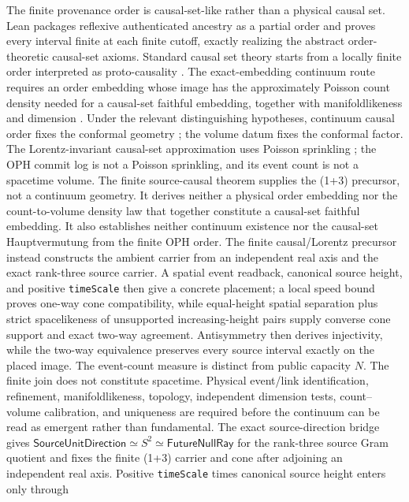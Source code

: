 The finite provenance order is causal-set-like rather than a physical causal
set. Lean packages reflexive authenticated ancestry as a partial order and
proves every interval finite at each finite cutoff, exactly realizing the
abstract order-theoretic causal-set axioms. Standard causal set theory starts from a locally finite order interpreted
as proto-causality \cite{bombelli1987,surya2019}. The exact-embedding continuum route
requires an order embedding whose image has the approximately Poisson count
density needed for a causal-set faithful embedding, together with
manifoldlikeness and dimension
\cite{bombellimeyer1989,brightwellgregory1991,majorrideoutsurya2007}. Under
the relevant distinguishing hypotheses, continuum causal order fixes the
conformal geometry \cite{hawkingkingmccarthy1976,malament1977}; the volume
datum fixes the conformal factor. The Lorentz-invariant causal-set
approximation uses Poisson sprinkling \cite{bombellihensonsorkin2009}; the OPH
commit log is not a Poisson sprinkling, and its event count is not a spacetime
volume. The finite source-causal theorem supplies the (1+3) precursor, not a
continuum geometry. It derives neither a physical order embedding nor the
count-to-volume density law that together constitute a causal-set faithful embedding.
It also establishes neither continuum existence nor the causal-set
Hauptvermutung from the finite OPH order.
The finite causal/Lorentz precursor instead constructs the ambient carrier
from an independent real axis and the exact rank-three source carrier. A
spatial event readback, canonical source height, and positive
\texttt{timeScale} then give a concrete
placement; a local speed bound proves one-way cone compatibility, while
equal-height spatial separation plus strict spacelikeness of unsupported
increasing-height pairs supply converse cone support and exact two-way
agreement. Antisymmetry then derives injectivity, while the two-way
equivalence preserves every source interval exactly on the placed image.
The event-count measure is distinct from public capacity \(N\). The finite join
does not constitute spacetime. Physical event/link identification, refinement,
manifoldlikeness, topology, independent dimension tests, count--volume
calibration, and uniqueness are required before the continuum can be read as
emergent rather than fundamental.
The exact source-direction bridge gives
\(\mathsf{SourceUnitDirection}\simeq S^2\simeq
\mathsf{FutureNullRay}\) for the rank-three source Gram quotient and fixes the
finite (1+3) carrier and cone after adjoining an independent real axis.
Positive \texttt{timeScale} times canonical source height enters only through
